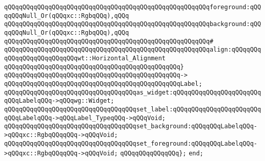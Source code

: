 \verb|qQQqqQQqqQQqqQQqqQQqqQQqqQQqqQQqqQQqqQQqqQQqqQQqqQQqqQQqforeground:qQQqqQQqNull_Or(qQQqxc::RgbqQQq),qQQq|\newline
\verb|qQQqqQQqqQQqqQQqqQQqqQQqqQQqqQQqqQQqqQQqqQQqqQQqqQQqqQQqbackground:qQQqqQQqNull_Or(qQQqxc::RgbqQQq),qQQq|\newline
\verb|qQQqqQQqqQQqqQQqqQQqqQQqqQQqqQQqqQQqqQQqqQQqqQQqqQQqqQQq#|\newline
\verb|qQQqqQQqqQQqqQQqqQQqqQQqqQQqqQQqqQQqqQQqqQQqqQQqqQQqqQQqalign:qQQqqQQqqQQqqQQqqQQqqQQqqQQqwt::Horizontal_Alignment|\newline
\verb|qQQqqQQqqQQqqQQqqQQqqQQqqQQqqQQqqQQqqQQqqQQqqQQq}|\newline
\verb|qQQqqQQqqQQqqQQqqQQqqQQqqQQqqQQqqQQqqQQqqQQqqQQq->|\newline
\verb|qQQqqQQqqQQqqQQqqQQqqQQqqQQqqQQqqQQqqQQqqQQqqQQqLabel;|\newline
\newline
\verb|qQQqqQQqqQQqqQQqqQQqqQQqqQQqqQQqqQQqas_widget:qQQqqQQqqQQqqQQqqQQqqQQqqQQqLabelqQQq->qQQqwg::Widget;|\newline
\newline
\verb|qQQqqQQqqQQqqQQqqQQqqQQqqQQqqQQqqQQqset_label:qQQqqQQqqQQqqQQqqQQqqQQqqQQqLabelqQQq->qQQqLabel_TypeqQQq->qQQqVoid;|\newline
\verb|qQQqqQQqqQQqqQQqqQQqqQQqqQQqqQQqqQQqset_background:qQQqqQQqLabelqQQq->qQQqxc::RgbqQQqqQQq->qQQqVoid;|\newline
\verb|qQQqqQQqqQQqqQQqqQQqqQQqqQQqqQQqqQQqset_foreground:qQQqqQQqLabelqQQq->qQQqxc::RgbqQQqqQQq->qQQqVoid;|\newline
\newline
\verb|qQQqqQQqqQQqqQQq};|\newline
\newline
\verb|end;|\newline
\newline
\newline

